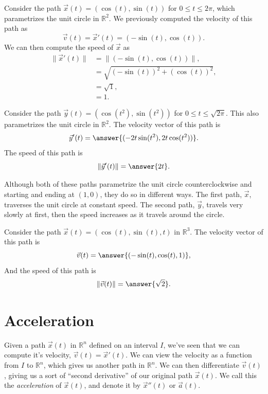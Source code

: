 \documentclass{ximera}
\begin{document}
\begin{example}
Consider the path $\vec{x}(t) = (\cos(t), \sin(t))$ for $0\leq t \leq 2\pi$, which parametrizes the unit circle in $\mathbb{R}^2$. We previously computed the velocity of this path as
\[
\vec{v}(t) = \vec{x}'(t) = (-\sin(t), \cos(t)).
\]
We can then compute the speed of $\vec{x}$ as
\begin{align*}
\|\vec{x}'(t)\| &= \|(-\sin(t), \cos(t))\|,\\
&= \sqrt{(-\sin(t))^2 + (\cos(t))^2},\\
& = \sqrt{1},\\
& = 1.
\end{align*}

Consider the path $\vec{y}(t) = (\cos(t^2), \sin(t^2))$ for $0\leq t\leq \sqrt{2\pi}$. This also parametrizes the unit circle in $\mathbb{R}^2$. The velocity vector of this path is
\[
\vec{y}'(t) = \answer{(-2t\sin(t^2), 2t\cos(t^2))}.
\]
The speed of this path is
\[
\|\vec{y}'(t)\| = \answer{2t}.
\]

Although both of these paths parametrize the unit circle counterclockwise and starting and ending at $(1,0)$, they do so in different ways. The first path, $\vec{x}$, traverses the unit circle at constant speed. The second path, $\vec{y}$, travels very slowly at first, then the speed increases as it travels around the circle.
\end{example}

\begin{example}
Consider the path $\vec{x}(t)=(\cos(t),\sin(t),t)$ in $\mathbb{R}^3$. The velocity vector of this path is
\[
\vec{v}(t) = \answer{(-\sin(t),\cos(t),1)},
\]
And the speed of this path is
\[
\|\vec{v}(t)\| = \answer{\sqrt{2}}.
\]
\end{example}

\section*{Acceleration}

Given a path $\vec{x}(t)$ in $\mathbb{R}^n$ defined on an interval $I$, we've seen that we can compute it's velocity, $\vec{v}(t) = \vec{x}'(t)$. We can view the velocity as a function from $I$ to $\mathbb{R}^n$, which gives us another path in $\mathbb{R}^n$. We can then differentiate $\vec{v}(t)$, giving us a sort of ``second derivative'' of our original path $\vec{x}(t)$. We call this the \emph{acceleration} of $\vec{x}(t)$, and denote it by $\vec{x}''(t)$ or $\vec{a}(t)$.
\end{document}
